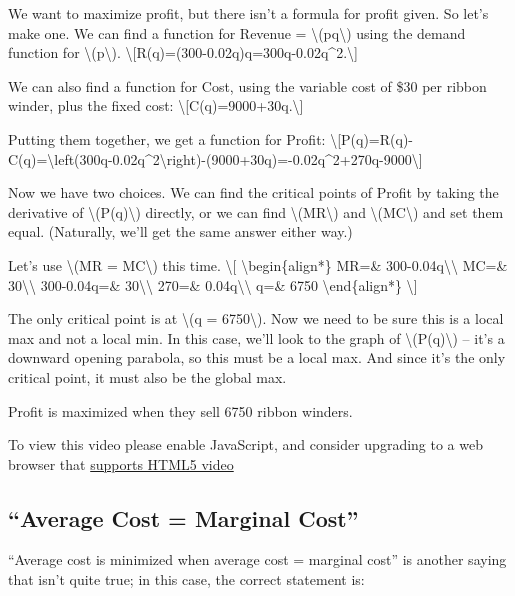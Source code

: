 We want to maximize profit, but there isn't a formula for profit given.
So let's make one. We can find a function for Revenue =
\textbackslash{}(pq\textbackslash{}) using the demand function for
\textbackslash{}(p\textbackslash{}).
\textbackslash{}{[}R(q)=(300-0.02q)q=300q-0.02q\^{}2.\textbackslash{}{]}

We can also find a function for Cost, using the variable cost of \$30
per ribbon winder, plus the fixed cost:
\textbackslash{}{[}C(q)=9000+30q.\textbackslash{}{]}

Putting them together, we get a function for Profit:
\textbackslash{}{[}P(q)=R(q)-C(q)=\textbackslash{}left(300q-0.02q\^{}2\textbackslash{}right)-(9000+30q)=-0.02q\^{}2+270q-9000\textbackslash{}{]}

Now we have two choices. We can find the critical points of Profit by
taking the derivative of \textbackslash{}(P(q)\textbackslash{})
directly, or we can find \textbackslash{}(MR\textbackslash{}) and
\textbackslash{}(MC\textbackslash{}) and set them equal. (Naturally,
we'll get the same answer either way.)

Let's use \textbackslash{}(MR = MC\textbackslash{}) this time.
\textbackslash{}{[} \textbackslash{}begin\{align*\} MR=\&
300-0.04q\textbackslash{}\textbackslash{} MC=\&
30\textbackslash{}\textbackslash{} 300-0.04q=\&
30\textbackslash{}\textbackslash{} 270=\&
0.04q\textbackslash{}\textbackslash{} q=\& 6750
\textbackslash{}end\{align*\} \textbackslash{}{]}

The only critical point is at \textbackslash{}(q =
6750\textbackslash{}). Now we need to be sure this is a local max and
not a local min. In this case, we'll look to the graph of
\textbackslash{}(P(q)\textbackslash{}) -- it's a downward opening
parabola, so this must be a local max. And since it's the only critical
point, it must also be the global max.

Profit is maximized when they sell 6750 ribbon winders.

To view this video please enable JavaScript, and consider upgrading to a
web browser that \href{http://videojs.com/html5-video-support/}{supports
HTML5 video}

\hypertarget{average-cost-marginal-cost}{%
\subsection{``Average Cost = Marginal
Cost''}\label{average-cost-marginal-cost}}

``Average cost is minimized when average cost = marginal cost'' is
another saying that isn't quite true; in this case, the correct
statement is:

